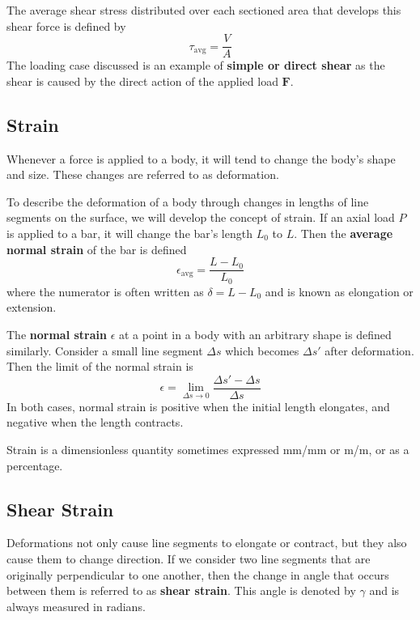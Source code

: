 \documentclass{article}
\begin{document}
The average shear stress distributed over each sectioned area that develops this shear force is
defined by
\begin{equation*}
    \tau_{\mathrm{avg}} = \frac{V}{A}
\end{equation*}
The loading case discussed is an example of \textbf{simple or direct shear} as the shear is caused
by the direct action of the applied load \(\symbf{F}\).
\subsection{Strain}
\begin{definition}[Deformation]
    Whenever a force is applied to a body, it will tend to change the body's shape and size.
    These changes are referred to as deformation.
\end{definition}
\begin{definition}[Strain]
    To describe the deformation of a body through changes in lengths of line segments on the surface,
    we will develop the concept of strain.
    If an axial load \(P\) is applied to a bar, it will change the bar's length \(L_0\) to \(L\).
    Then the \textbf{average normal strain} of the bar is defined
    \begin{equation*}
        \epsilon_{\mathrm{avg}} = \frac{L - L_0}{L_0}
    \end{equation*}
    where the numerator is often written as \(\delta = L - L_0\) and is known as elongation or extension.

    The \textbf{normal strain} \(\epsilon\) at a point in a body with an arbitrary shape is defined similarly.
    Consider a small line segment \(\Delta s\) which becomes \(\Delta s'\) after deformation. Then the limit of the normal strain
    is
    \begin{equation*}
        \epsilon = \lim_{\Delta s \to 0} \frac{\Delta s' - \Delta s}{\Delta s}
    \end{equation*}
    In both cases, normal strain is positive when the initial length elongates, and negative when the length contracts.

    Strain is a dimensionless quantity sometimes expressed \unit{mm/mm} or \unit{m/m}, or as a percentage.
\end{definition}
\subsection{Shear Strain}
Deformations not only cause line segments to elongate or contract, but they also cause them to change direction.
If we consider two line segments that are originally perpendicular to one another, then the
change in angle that occurs between them is referred to as \textbf{shear strain}.
This angle is denoted by \(\gamma\) and is always measured in radians.
\end{document}

